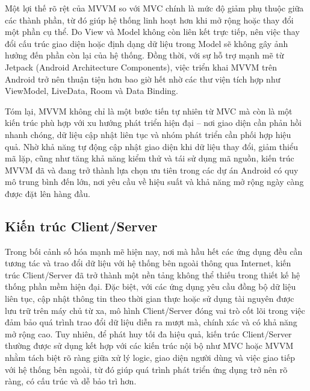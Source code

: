     
      \hspace*{0.8cm}Một lợi thế rõ rệt của MVVM so với MVC chính là mức độ giảm phụ thuộc giữa các thành phần, từ đó giúp hệ thống linh hoạt hơn khi mở rộng hoặc thay đổi một phần cụ thể. Do View và Model không còn liên kết trực tiếp, nên việc thay đổi cấu trúc giao diện hoặc định dạng dữ liệu trong Model sẽ không gây ảnh hưởng đến phần còn lại của hệ thống. Đồng thời, với sự hỗ trợ mạnh mẽ từ Jetpack (Android Architecture Components), việc triển khai MVVM trên Android trở nên thuận tiện hơn bao giờ hết nhờ các thư viện tích hợp như ViewModel, LiveData, Room và Data Binding.
    \vspace{0.5em}

    
      \hspace*{0.8cm}Tóm lại, MVVM không chỉ là một bước tiến tự nhiên từ MVC mà còn là một kiến trúc phù hợp với xu hướng phát triển hiện đại – nơi giao diện cần phản hồi nhanh chóng, dữ liệu cập nhật liên tục và nhóm phát triển cần phối hợp hiệu quả. Nhờ khả năng tự động cập nhật giao diện khi dữ liệu thay đổi, giảm thiểu mã lặp, cũng như tăng khả năng kiểm thử và tái sử dụng mã nguồn, kiến trúc MVVM đã và đang trở thành lựa chọn ưu tiên trong các dự án Android có quy mô trung bình đến lớn, nơi yêu cầu về hiệu suất và khả năng mở rộng ngày càng được đặt lên hàng đầu.
    \vspace{0.5em}

\subsection{Kiến trúc Client/Server}
\renewcommand{\labelitemi}{--}    
    
        \hspace*{0.8cm}Trong bối cảnh số hóa mạnh mẽ hiện nay, nơi mà hầu hết các ứng dụng đều cần tương tác và trao đổi dữ liệu với hệ thống bên ngoài thông qua Internet, kiến trúc Client/Server đã trở thành một nền tảng không thể thiếu trong thiết kế hệ thống phần mềm hiện đại. Đặc biệt, với các ứng dụng yêu cầu đồng bộ dữ liệu liên tục, cập nhật thông tin theo thời gian thực hoặc sử dụng tài nguyên được lưu trữ trên máy chủ từ xa, mô hình Client/Server đóng vai trò cốt lõi trong việc đảm bảo quá trình trao đổi dữ liệu diễn ra mượt mà, chính xác và có khả năng mở rộng cao. Tuy nhiên, để phát huy tối đa hiệu quả, kiến trúc Client/Server thường được sử dụng kết hợp với các kiến trúc nội bộ như MVC hoặc MVVM nhằm tách biệt rõ ràng giữa xử lý logic, giao diện người dùng và việc giao tiếp với hệ thống bên ngoài, từ đó giúp quá trình phát triển ứng dụng trở nên rõ ràng, có cấu trúc và dễ bảo trì hơn.
    \vspace{0.5em}

